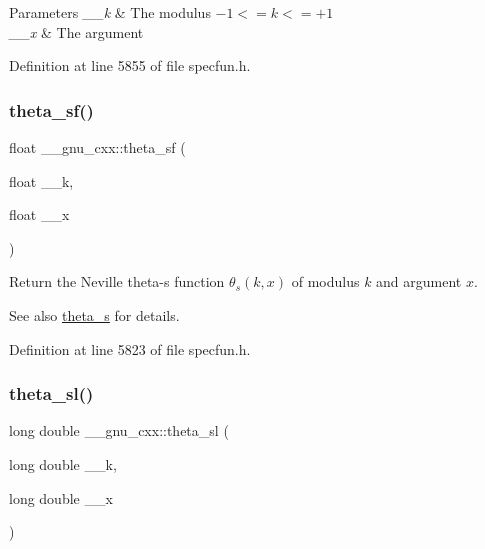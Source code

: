 \begin{DoxyParams}{Parameters}
{\em \+\_\+\+\_\+k} & The modulus $ -1 <= k <= +1 $ \\
\hline
{\em \+\_\+\+\_\+x} & The argument \\
\hline
\end{DoxyParams}


Definition at line 5855 of file specfun.\+h.

\mbox{\label{group__gnu__math__spec__func_ga5e69cf30c9a4cc057accc43e8c4bf7a3}} 
\subsubsection{\texorpdfstring{theta\+\_\+sf()}{theta\_sf()}}
{\footnotesize\ttfamily float \+\_\+\+\_\+gnu\+\_\+cxx\+::theta\+\_\+sf (\begin{DoxyParamCaption}\item[{float}]{\+\_\+\+\_\+k,  }\item[{float}]{\+\_\+\+\_\+x }\end{DoxyParamCaption})\hspace{0.3cm}{\ttfamily [inline]}}

Return the Neville theta-\/s function $ \theta_s(k,x) $ of modulus $ k $ and argument $ x $.

\begin{DoxySeeAlso}{See also}
\hyperlink{group__gnu__math__spec__func_gaf28f2dca107531890b49cccf2bdd67be}{theta\+\_\+s} for details. 
\end{DoxySeeAlso}


Definition at line 5823 of file specfun.\+h.

\mbox{\label{group__gnu__math__spec__func_gac574077067a4e7b24a0a9ff2d537d885}} 
\subsubsection{\texorpdfstring{theta\+\_\+sl()}{theta\_sl()}}
{\footnotesize\ttfamily long double \+\_\+\+\_\+gnu\+\_\+cxx\+::theta\+\_\+sl (\begin{DoxyParamCaption}\item[{long double}]{\+\_\+\+\_\+k,  }\item[{long double}]{\+\_\+\+\_\+x }\end{DoxyParamCaption})\hspace{0.3cm}{\ttfamily [inline]}}

